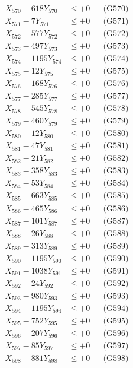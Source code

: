 \documentclass[a4paper,10pt]{article}
\begin{document}
{\begin{align}
X_{570} - 618Y_{570} &\leq +0 && \text{(G570)} \\
\allowbreak
X_{571} - 7Y_{571} &\leq +0 && \text{(G571)} \\
X_{572} - 577Y_{572} &\leq +0 && \text{(G572)} \\
X_{573} - 497Y_{573} &\leq +0 && \text{(G573)} \\
X_{574} - 1195Y_{574} &\leq +0 && \text{(G574)} \\
X_{575} - 12Y_{575} &\leq +0 && \text{(G575)} \\
X_{576} - 168Y_{576} &\leq +0 && \text{(G576)} \\
X_{577} - 285Y_{577} &\leq +0 && \text{(G577)} \\
X_{578} - 545Y_{578} &\leq +0 && \text{(G578)} \\
X_{579} - 460Y_{579} &\leq +0 && \text{(G579)} \\
X_{580} - 12Y_{580} &\leq +0 && \text{(G580)} \\
\allowbreak
X_{581} - 47Y_{581} &\leq +0 && \text{(G581)} \\
X_{582} - 21Y_{582} &\leq +0 && \text{(G582)} \\
X_{583} - 358Y_{583} &\leq +0 && \text{(G583)} \\
X_{584} - 53Y_{584} &\leq +0 && \text{(G584)} \\
X_{585} - 663Y_{585} &\leq +0 && \text{(G585)} \\
X_{586} - 465Y_{586} &\leq +0 && \text{(G586)} \\
X_{587} - 101Y_{587} &\leq +0 && \text{(G587)} \\
X_{588} - 26Y_{588} &\leq +0 && \text{(G588)} \\
X_{589} - 313Y_{589} &\leq +0 && \text{(G589)} \\
X_{590} - 1195Y_{590} &\leq +0 && \text{(G590)} \\
\allowbreak
X_{591} - 1038Y_{591} &\leq +0 && \text{(G591)} \\
X_{592} - 24Y_{592} &\leq +0 && \text{(G592)} \\
X_{593} - 980Y_{593} &\leq +0 && \text{(G593)} \\
X_{594} - 1195Y_{594} &\leq +0 && \text{(G594)} \\
X_{595} - 752Y_{595} &\leq +0 && \text{(G595)} \\
X_{596} - 207Y_{596} &\leq +0 && \text{(G596)} \\
X_{597} - 85Y_{597} &\leq +0 && \text{(G597)} \\
X_{598} - 881Y_{598} &\leq +0 && \text{(G598)} \\

\end{align}}
\end{document}
